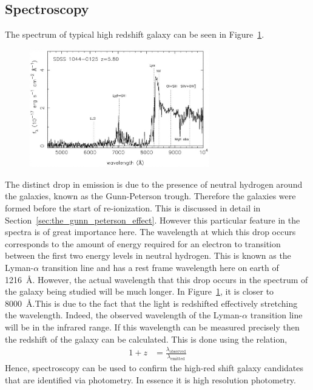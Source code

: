 \subsection{Spectroscopy} %
\label{sec:spectroscopy}
	The spectrum of typical high redshift galaxy can be seen in Figure~\ref{fig:high_redshift_galaxy_spectrum}.
	\begin{figure}[htbp]
		\centering
			\includegraphics[width=0.7\textwidth]{../Images/high_redshift_galaxy_spec.jpg}
		\caption{\label{fig:high_redshift_galaxy_spectrum}}
	\end{figure}

	The distinct drop in emission is due to the presence of neutral hydrogen around the galaxies, known as the Gunn-Peterson trough. Therefore the galaxies were formed before the start of re-ionization. This is discussed in detail in Section~\ref{sec:the_gunn_peterson_effect}. However this particular feature in the spectra is of great importance here. The wavelength at which this drop occurs corresponds to the amount of energy required for an electron to transition between the first two energy levels in neutral hydrogen. This is known as the Lyman-$\alpha$ transition line and has a rest frame wavelength here on earth of \SI{1216}{\angstrom}\cite{LymanAlphaForest}\cite{TransofAtomicH}. However, the actual wavelength that this drop occurs in the spectrum of the galaxy being studied will be much longer. In Figure~\ref{fig:high_redshift_galaxy_spectrum}, it is closer to \SI{8000}{\angstrom}.This is due to the fact that the light is redshifted effectively stretching the wavelength. Indeed, the observed wavelength of the Lyman-$\alpha$ transition line will be in the infrared range. If this wavelength can be measured precisely then the redshift of the galaxy can be calculated\cite{EvidenceRion}. This is done using the relation,
	\begin{align}
		1+z &= \frac{\lambda_{\text{observed}}}{\lambda_{\text{emitted}}} \label{eq:spectroscopy}
	\end{align}
	Hence, spectroscopy can be used to confirm the high-red shift galaxy candidates that are identified via photometry. In essence it is high resolution photometry.


